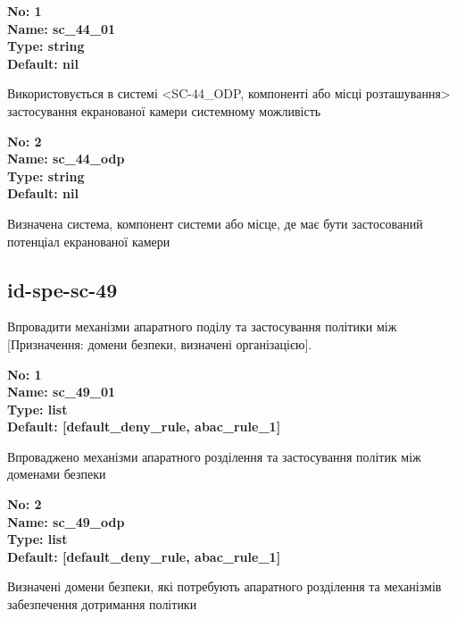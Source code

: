 \documentclass{article}
\begin{document}
\vspace{10pt}
{\footnotesize\bfseries
No: 1\\
Name: sc\_\allowbreak{}44\_\allowbreak{}01\\
Type: string\\
Default: nil
}

{\footnotesize Використовується в системі <SC-44\_\allowbreak{}ODP, компоненті або місці розташування> застосування екранованої камери системному можливість}


{\footnotesize\bfseries
No: 2\\
Name: sc\_\allowbreak{}44\_\allowbreak{}odp\\
Type: string\\
Default: nil
}

{\footnotesize Визначена система, компонент системи або місце, де має бути застосований потенціал екранованої камери}




\subsection{id-spe-sc-49}
Впровадити механізми апаратного поділу та застосування політики між [Призначення: домени безпеки, визначені організацією].

\vspace{10pt}
{\footnotesize\bfseries
No: 1\\
Name: sc\_\allowbreak{}49\_\allowbreak{}01\\
Type: list\\
Default: [\textquotedbl{}default\_\allowbreak{}deny\_\allowbreak{}rule\textquotedbl{}, \textquotedbl{}abac\_\allowbreak{}rule\_\allowbreak{}1\textquotedbl{}]
}

{\footnotesize Впроваджено механізми апаратного розділення та застосування політик між доменами безпеки}


{\footnotesize\bfseries
No: 2\\
Name: sc\_\allowbreak{}49\_\allowbreak{}odp\\
Type: list\\
Default: [\textquotedbl{}default\_\allowbreak{}deny\_\allowbreak{}rule\textquotedbl{}, \textquotedbl{}abac\_\allowbreak{}rule\_\allowbreak{}1\textquotedbl{}]
}

{\footnotesize Визначені домени безпеки, які потребують апаратного розділення та механізмів забезпечення дотримання політики}
\end{document}
